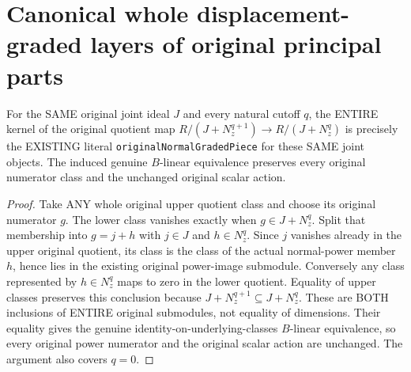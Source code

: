 \section{Canonical whole displacement-graded layers of original principal parts}

\begin{theorem}
\label{hir:actual-centre-principal-parts-canonical-graded-kernel}
For the SAME original joint ideal $J$ and every natural cutoff $q$,
the ENTIRE kernel of the original quotient map
$R/(J+N_z^{q+1})\to R/(J+N_z^q)$ is precisely the EXISTING literal
\texttt{originalNormalGradedPiece} for these SAME joint objects.
The induced genuine $B$-linear equivalence preserves every original
numerator class and the unchanged original scalar action.
\leanok
\end{theorem}
\begin{proof}
Take ANY whole original upper quotient class and choose its original
numerator $g$. The lower class vanishes exactly when
$g\in J+N_z^q$. Split that membership into $g=j+h$ with $j\in J$ and
$h\in N_z^q$. Since $j$ vanishes already in the upper original quotient,
its class is the class of the actual normal-power member $h$, hence
lies in the existing original power-image submodule. Conversely any
class represented by $h\in N_z^q$ maps to zero in the lower quotient.
Equality of upper classes preserves this conclusion because
$J+N_z^{q+1}\subseteq J+N_z^q$. These are BOTH inclusions of ENTIRE
original submodules, not equality of dimensions. Their equality gives
the genuine identity-on-underlying-classes $B$-linear equivalence,
so every original power numerator and the original scalar action are
unchanged. The argument also covers $q=0$.
\end{proof}

